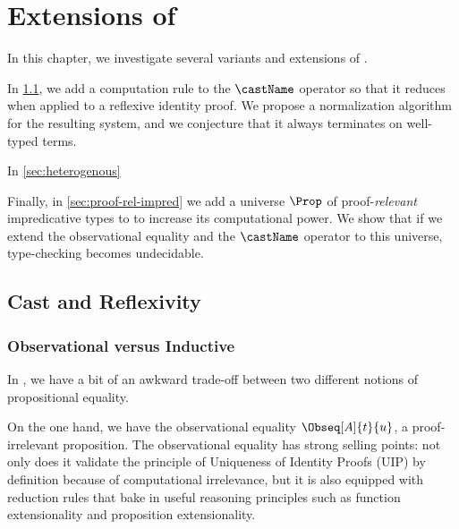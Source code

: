 \setchapterpreamble[u]{\margintoc}
\chapter{Extensions of \SetoidCC}

In this chapter, we investigate several variants and extensions of \SetoidCC.

In \cref{sec:cast-refl}, we add a computation rule to the \( \castName \)
operator so that it reduces when applied to a reflexive identity proof. 
We propose a normalization algorithm for the resulting system, and we 
conjecture that it always terminates on well-typed terms.

In \cref{sec:heterogenous}

Finally, in \cref{sec:proof-rel-impred} we add a universe \( \Prop \) of 
proof-\emph{relevant} impredicative types to \SetoidCC to increase
its computational power.
% 
We show that if we extend the observational equality and the \( \castName \)
operator to this universe, type-checking becomes undecidable.

\section{Cast and Reflexivity}
\label{sec:cast-refl}

\subsection{Observational versus Inductive}

In \SetoidCC, we have a bit of an awkward trade-off between two different 
notions of propositional equality.

On the one hand, we have the observational equality \( \Obseq[A]{t}{u} \),
a proof-irrelevant proposition.
% 
The observational equality has strong selling points: not only does it validate 
the principle of Uniqueness of Identity Proofs (UIP) by definition because of 
computational irrelevance, but it is also equipped with reduction rules that 
bake in useful reasoning principles such as function extensionality and proposition 
extensionality.

